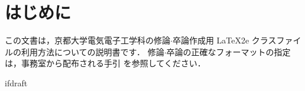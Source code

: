 \documentclass{jsarticle}
\begin{document}
\fi

\chapter{はじめに}
\label{chap:intro}

この文書は，京都大学電気電子工学科の修論$\cdot$卒論作成用 \LaTeX2e{}
クラスファイルの利用方法についての説明書です．
%
修論$\cdot$卒論の正確なフォーマットの指定は，事務室から配布される手引
を参照してください．

\expandafter\ifx\csname ifdraft\endcsname\relax
  
\end{document}
